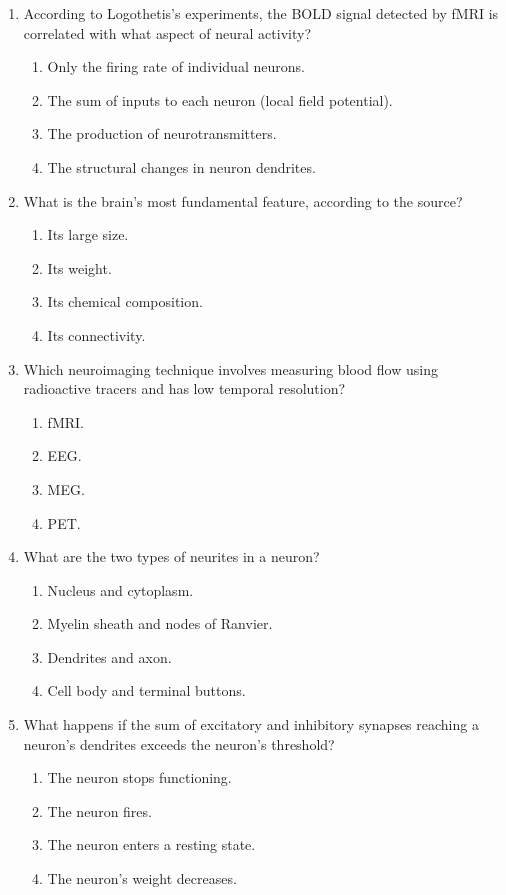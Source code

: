 \documentclass{article}
\begin{document}
\begin{enumerate}[label=\arabic*.]
\item According to Logothetis's experiments, the BOLD signal detected by fMRI is correlated with what aspect of neural activity?
\begin{enumerate}[label=(\alph*)]
    \item Only the firing rate of individual neurons.
    \item The sum of inputs to each neuron (local field potential).
    \item The production of neurotransmitters.
    \item The structural changes in neuron dendrites.
\end{enumerate}

\item What is the brain's most fundamental feature, according to the source?
\begin{enumerate}[label=(\alph*)]
    \item Its large size.
    \item Its weight.
    \item Its chemical composition.
    \item Its connectivity.
\end{enumerate}

\item Which neuroimaging technique involves measuring blood flow using radioactive tracers and has low temporal resolution?
\begin{enumerate}[label=(\alph*)]
    \item fMRI.
    \item EEG.
    \item MEG.
    \item PET.
\end{enumerate}

\item What are the two types of neurites in a neuron?
\begin{enumerate}[label=(\alph*)]
    \item Nucleus and cytoplasm.
    \item Myelin sheath and nodes of Ranvier.
    \item Dendrites and axon.
    \item Cell body and terminal buttons.
\end{enumerate}

\item What happens if the sum of excitatory and inhibitory synapses reaching a neuron's dendrites exceeds the neuron's threshold?
\begin{enumerate}[label=(\alph*)]
    \item The neuron stops functioning.
    \item The neuron fires.
    \item The neuron enters a resting state.
    \item The neuron's weight decreases.
\end{enumerate}


\end{enumerate}
\end{document}
